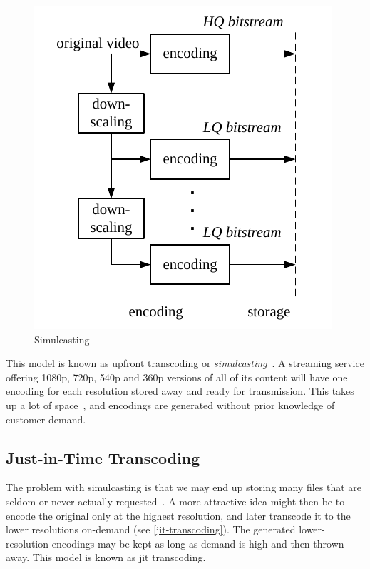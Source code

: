 \begin{figure}
    \centering
    \includegraphics[scale=1.2]{pictures/visio/simulcast}
    \caption{Simulcasting}
    \label{fig:simulcasting}
\end{figure}

This model is known as upfront transcoding or \textit{simulcasting}~\cite{Rusert}. A streaming service offering 1080p, 720p, 540p and 360p versions of all of its content will have one encoding for each resolution stored away and ready for transmission. This takes up a lot of space~\cite{Van_Wallendael}, and encodings are generated without prior knowledge of customer demand.

\subsection{Just-in-Time Transcoding}
\label{subsec:jit-transcoding}
The problem with simulcasting is that we may end up storing many files that are seldom or never actually requested~\cite{Rusert}. A more attractive idea might then be to encode the original only at the highest resolution, and later transcode it to the lower resolutions on-demand (see \cref{jit-transcoding}). The generated lower-resolution encodings may be kept as long as demand is high and then thrown away. This model is known as \gls{jit} transcoding.


